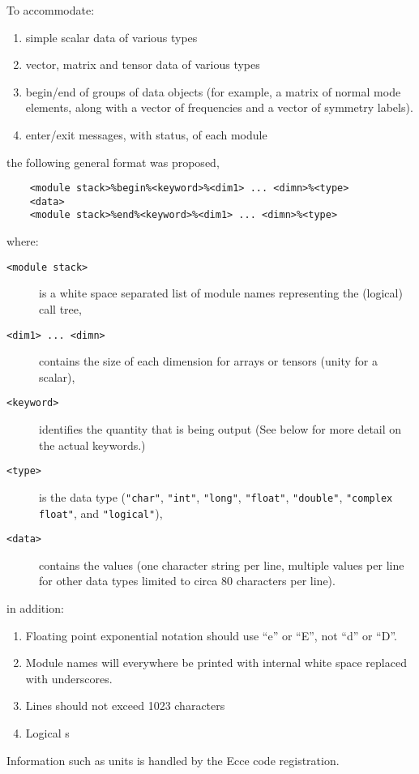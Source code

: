 To accommodate:
\begin{enumerate}
\item simple scalar data of various types
\item vector, matrix and tensor data of various types
\item begin/end of groups of data objects (for example, a matrix of
  normal mode elements, along with a vector of frequencies and a
  vector of symmetry labels).
\item enter/exit messages, with status, of each module
\end{enumerate}
the following general format was proposed,
\begin{verbatim}
    <module stack>%begin%<keyword>%<dim1> ... <dimn>%<type>
    <data>
    <module stack>%end%<keyword>%<dim1> ... <dimn>%<type>
\end{verbatim}
where:
\begin{description}
\item [\texttt{<module stack>}]  is a white space separated list of
  module names representing the (logical) call tree,
\item [\texttt{<dim1> ... <dimn>}] contains the size of each dimension
for arrays or tensors (unity for a scalar),
\item [\texttt{<keyword>}] identifies the quantity that is being output
(See below for more detail on the actual keywords.)
\item [\texttt{<type>}] is the data type (\texttt{"char"}, \texttt{"int"},
  \texttt{"long"}, \texttt{"float"}, \texttt{"double"}, \texttt{"complex
  float"}, and \texttt{"logical"}),
\item [\texttt{<data>}] contains the values (one character string per 
line, multiple values per line for other data types limited to circa
80 characters per line).
\end{description}
in addition:
\begin{enumerate}
\item Floating point exponential  notation should  use ``e'' or ``E'', 
  not ``d'' or ``D''.
\item Module names will everywhere be printed with internal white space
  replaced with underscores.
\item Lines should not exceed 1023 characters
\item Logical s
\end{enumerate}

Information such as units is handled by the Ecce code registration.

